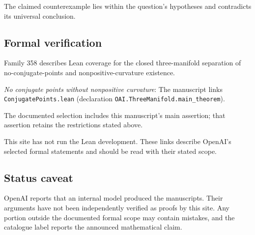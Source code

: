 \documentclass[11pt]{article}
\begin{document}
The claimed counterexample lies within the question’s hypotheses and contradicts its universal conclusion.

\subsection{Formal verification}
Family 358 describes Lean coverage for the closed three-manifold separation of no-conjugate-points and nonpositive-curvature existence.

\textit{No conjugate points without nonpositive curvature}: The manuscript links \texttt{ConjugatePoints.lean} (declaration \texttt{OAI.ThreeManifold.main\_theorem}).

The documented selection includes this manuscript’s main assertion; that assertion retains the restrictions stated above.

This site has not run the Lean development. These links describe OpenAI’s selected formal statements and should be read with their stated scope.

\subsection{Status caveat}
OpenAI reports that an internal model produced the manuscripts. Their arguments have not been independently verified as proofs by this site. Any portion outside the documented formal scope may contain mistakes, and the catalogue label reports the announced mathematical claim.
\end{document}
